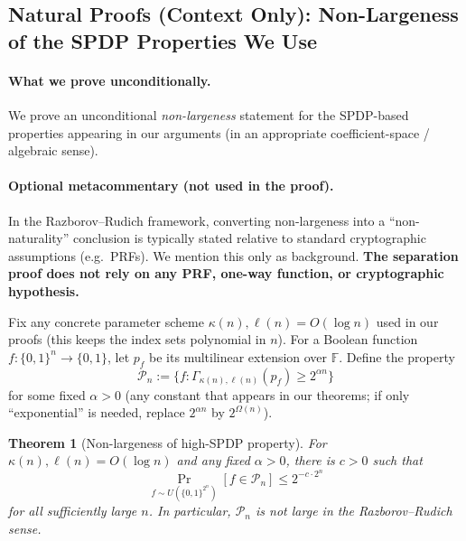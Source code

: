 \documentclass[12pt]{article}
\newtheorem{theorem}{Theorem}
\theoremstyle{definition}
\theoremstyle{definition}
\theoremstyle{remark}
\theoremstyle{remark}
\begin{document}
\subsection{Natural Proofs (Context Only): Non-Largeness of the SPDP Properties We Use}
\label{subsec:natural-proofs-context}

\paragraph{What we prove unconditionally.}
We prove an unconditional \emph{non-largeness} statement for the SPDP-based properties
appearing in our arguments (in an appropriate coefficient-space / algebraic sense).

\paragraph{Optional metacommentary (not used in the proof).}
In the Razborov--Rudich framework, converting non-largeness into a ``non-naturality''
conclusion is typically stated relative to standard cryptographic assumptions (e.g.\ PRFs).
We mention this only as background. \textbf{The separation proof does not rely on any PRF,
one-way function, or cryptographic hypothesis.}

Fix any concrete parameter scheme $\kappa(n), \ell(n) = O(\log n)$ used in our proofs (this keeps the index sets polynomial in $n$). For a Boolean function $f : \{0,1\}^n \to \{0,1\}$, let $p_f$ be its multilinear extension over $\mathbb{F}$. Define the property
\[
\mathcal{P}_n := \{f : \Gamma_{\kappa(n),\ell(n)}(p_f) \geq 2^{\alpha n}\}
\]
for some fixed $\alpha > 0$ (any constant that appears in our theorems; if only ``exponential'' is needed, replace $2^{\alpha n}$ by $2^{\Omega(n)}$).

\begin{theorem}[Non-largeness of high-SPDP property]\label{thm:non-largeness}
For $\kappa(n), \ell(n) = O(\log n)$ and any fixed $\alpha > 0$, there is $c > 0$ such that
\[
\Pr_{f \sim U(\{0,1\}^{2^n})}[f \in \mathcal{P}_n] \leq 2^{-c \cdot 2^n}
\]
for all sufficiently large $n$. In particular, $\mathcal{P}_n$ is not large in the Razborov--Rudich sense.
\end{theorem}
\end{document}

